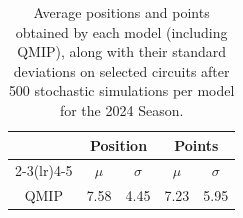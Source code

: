 \begin{table}[H]
\centering
\begin{tabular}{ccccc}
\toprule
\multicolumn{1}{l}{}               & \multicolumn{2}{c}{Position}   & \multicolumn{2}{c}{Points} \\ \cmidrule(lr){2-3}\cmidrule(lr){4-5}
\multicolumn{1}{c}{Model}          &    $\mu$ & $\sigma$ &   $\mu$  & $\sigma$ \\ \midrule
\multicolumn{1}{c}{QMIP          } &     7.58  &     4.45  &     7.23  &     5.95  \\
\bottomrule
\end{tabular}
\caption{Average positions and points obtained by each model (including QMIP), along with their standard deviations on selected circuits after 500 stochastic simulations per model for the 2024 Season.}
\label{tab:tab_qmip_vs_drl_stochastic_2024}
\end{table}